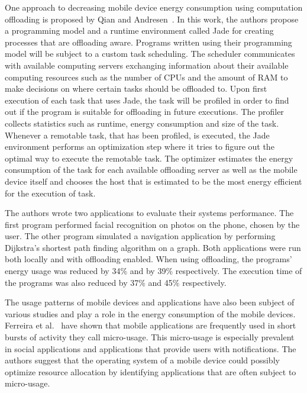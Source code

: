 One approach to decreasing mobile device energy consumption using computation offloading is proposed by Qian and Andresen~\cite{7176219}. In this work, the authors propose a programming model and a runtime environment called Jade for creating processes that are offloading aware. Programs written using their programming model will be subject to a custom task scheduling. The scheduler communicates with available computing servers exchanging information about their available computing resources such as the number of CPUs and the amount of RAM to make decisions on where certain tasks should be offloaded to. Upon first execution of each task that uses Jade, the task will be profiled in order to find out if the program is suitable for offloading in future executions. The profiler collects statistics such as runtime, energy consumption and size of the task. Whenever a remotable task, that has been profiled, is executed, the Jade environment performs an optimization step where it tries to figure out the optimal way to execute the remotable task. The optimizer estimates the energy consumption of the task for each available offloading server as well as the mobile device itself and chooses the host that is estimated to be the most energy efficient for the execution of task.

The authors wrote two applications to evaluate their systems performance. The first program performed facial recognition on photos on the phone, chosen by the user. The other program simulated a navigation application by performing Dijkstra's shortest path finding algorithm on a graph. Both applications were run both locally and with offloading enabled. When using offloading, the programs' energy usage was reduced by 34\% and by 39\% respectively. The execution time of the programs was also reduced by 37\% and 45\% respectively.                 


The usage patterns of mobile devices and applications have also been subject of various studies and play a role in the energy consumption of the mobile devices. Ferreira et al.~\cite{Ferreira:2014:CES:2628363.2628367} have shown that mobile applications are frequently used in short bursts of activity they call micro-usage. This micro-usage is especially prevalent in social applications and applications that provide users with notifications. The authors suggest that the operating system of a mobile device could possibly optimize resource allocation by identifying applications that are often subject to micro-usage.

